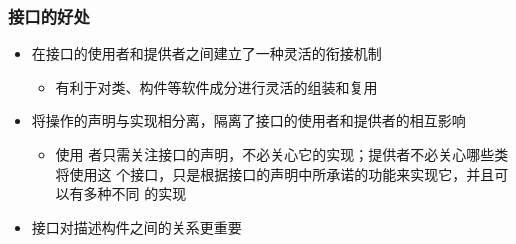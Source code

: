 \documentclass[compress]{beamer}
\begin{document}
  \begin{frame}
    \frametitle{接口的好处}

    \begin{itemize}
      \item 在接口的使用者和提供者之间建立了一种灵活的衔接机制
        \begin{itemize}
          \item [] 有利于对类、构件等软件成分进行灵活的组装和复用
        \end{itemize}

  \item 将操作的声明与实现相分离，隔离了接口的使用者和提供者的相互影响
    \begin{itemize}
      \item [] 使用
    者只需关注接口的声明，不必关心它的实现；提供者不必关心哪些类将使用这
    个接口，只是根据接口的声明中所承诺的功能来实现它，并且可以有多种不同
    的实现
      \end{itemize}
    \item 接口对描述构件之间的关系更重要
    \end{itemize}

  \end{frame}
\end{document}
